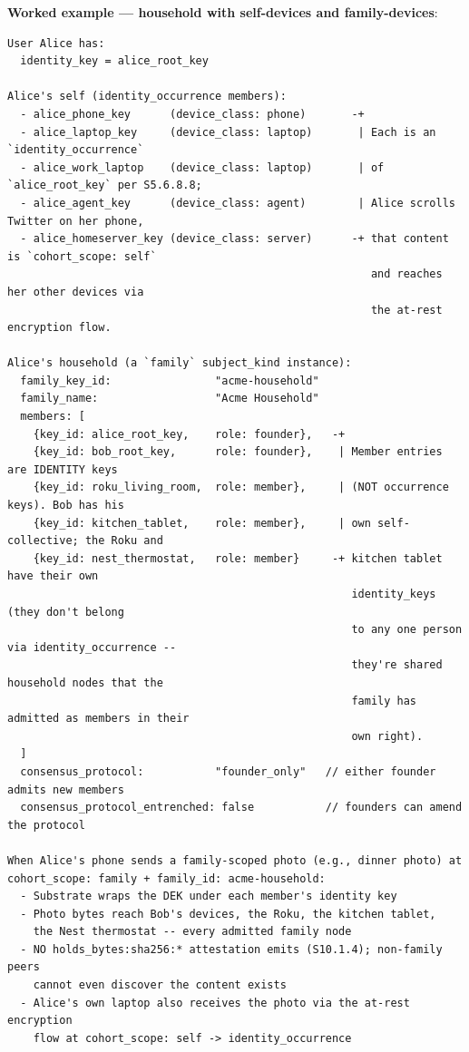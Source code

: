 \documentclass[10pt]{article}
\begin{document}
\textbf{Worked example — household with self-devices and family-devices}:


\begin{lstlisting}
User Alice has:
  identity_key = alice_root_key

Alice's self (identity_occurrence members):
  - alice_phone_key      (device_class: phone)       -+
  - alice_laptop_key     (device_class: laptop)       | Each is an `identity_occurrence`
  - alice_work_laptop    (device_class: laptop)       | of `alice_root_key` per S5.6.8.8;
  - alice_agent_key      (device_class: agent)        | Alice scrolls Twitter on her phone,
  - alice_homeserver_key (device_class: server)      -+ that content is `cohort_scope: self`
                                                        and reaches her other devices via
                                                        the at-rest encryption flow.

Alice's household (a `family` subject_kind instance):
  family_key_id:                "acme-household"
  family_name:                  "Acme Household"
  members: [
    {key_id: alice_root_key,    role: founder},   -+
    {key_id: bob_root_key,      role: founder},    | Member entries are IDENTITY keys
    {key_id: roku_living_room,  role: member},     | (NOT occurrence keys). Bob has his
    {key_id: kitchen_tablet,    role: member},     | own self-collective; the Roku and
    {key_id: nest_thermostat,   role: member}     -+ kitchen tablet have their own
                                                     identity_keys (they don't belong
                                                     to any one person via identity_occurrence --
                                                     they're shared household nodes that the
                                                     family has admitted as members in their
                                                     own right).
  ]
  consensus_protocol:           "founder_only"   // either founder admits new members
  consensus_protocol_entrenched: false           // founders can amend the protocol

When Alice's phone sends a family-scoped photo (e.g., dinner photo) at
cohort_scope: family + family_id: acme-household:
  - Substrate wraps the DEK under each member's identity key
  - Photo bytes reach Bob's devices, the Roku, the kitchen tablet,
    the Nest thermostat -- every admitted family node
  - NO holds_bytes:sha256:* attestation emits (S10.1.4); non-family peers
    cannot even discover the content exists
  - Alice's own laptop also receives the photo via the at-rest encryption
    flow at cohort_scope: self -> identity_occurrence


\end{lstlisting}
\end{document}

